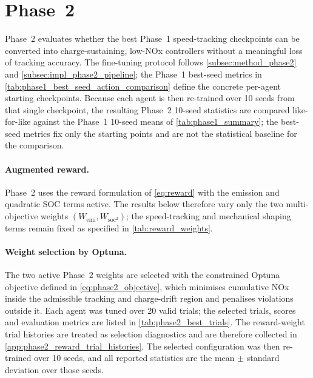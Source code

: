 \section{Phase~2}
\label{sec:results_phase2}
Phase~2 evaluates whether the best Phase~1 speed-tracking checkpoints can be converted into charge-sustaining, low-\ac{NOx} controllers without a meaningful loss of tracking accuracy. The fine-tuning protocol follows \autoref{subsec:method_phase2} and \autoref{subsec:impl_phase2_pipeline}; the Phase~1 best-seed metrics in \autoref{tab:phase1_best_seed_action_comparison} define the concrete per-agent starting checkpoints. Because each agent is then re-trained over 10 seeds from that single checkpoint, the resulting Phase~2 10-seed statistics are compared like-for-like against the Phase~1 10-seed means of \autoref{tab:phase1_summary}; the best-seed metrics fix only the starting points and are not the statistical baseline for the comparison.

\paragraph{Augmented reward.} Phase~2 uses the reward formulation of \autoref{eq:reward} with the emission and quadratic \ac{SOC} terms active. The results below therefore vary only the two multi-objective weights $(W_{\text{emi}}, W_{\text{soc}^2})$; the speed-tracking and mechanical shaping terms remain fixed as specified in \autoref{tab:reward_weights}.

\paragraph{Weight selection by Optuna.} The two active Phase~2 weights are selected with the constrained Optuna objective defined in \autoref{eq:phase2_objective}, which minimises cumulative \ac{NOx} inside the admissible tracking and charge-drift region and penalises violations outside it. Each agent was tuned over 20 valid trials; the selected trials, scores and evaluation metrics are listed in \autoref{tab:phase2_best_trials}. The reward-weight trial histories are treated as selection diagnostics and are therefore collected in \autoref{app:phase2_reward_trial_histories}. The selected configuration was then re-trained over 10 seeds, and all reported statistics are the mean $\pm$ standard deviation over those seeds.

